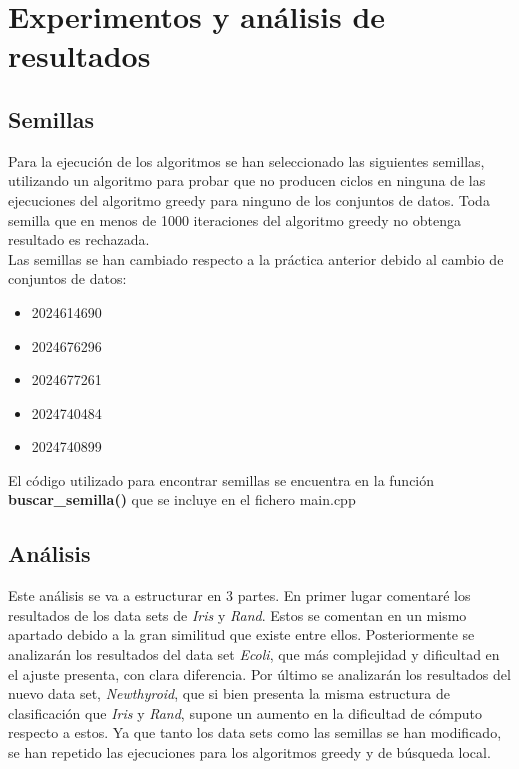\chapter{Experimentos y análisis de resultados}
\section{Semillas}
Para la ejecución de los algoritmos se han seleccionado las siguientes semillas, utilizando un algoritmo para probar que no producen ciclos en ninguna de las ejecuciones del algoritmo greedy para ninguno de los conjuntos de datos. Toda semilla que en menos de 1000 iteraciones del algoritmo greedy no obtenga resultado es rechazada. \\
Las semillas se han cambiado respecto a la práctica anterior debido al cambio de conjuntos de datos:
\begin{itemize}
   \item 2024614690
   \item 2024676296
   \item 2024677261
   \item 2024740484
   \item 2024740899
\end{itemize}


El código utilizado para encontrar semillas se encuentra en la función \textbf{buscar\_semilla()} que se incluye en el fichero main.cpp


\section{Análisis}
Este análisis se va a estructurar en 3 partes. En primer lugar comentaré los resultados de los data sets de \emph{Iris} y \emph{Rand}. Estos se comentan en un mismo apartado debido a la gran similitud que existe entre ellos. Posteriormente se analizarán los resultados del data set \emph{Ecoli}, que más complejidad y dificultad en el ajuste presenta, con clara diferencia. Por último se analizarán los resultados del nuevo data set, \emph{Newthyroid}, que si bien presenta la misma estructura de clasificación que \emph{Iris} y \emph{Rand}, supone un aumento en la dificultad de cómputo respecto a estos. Ya que tanto los data sets como las semillas se han modificado, se han repetido las ejecuciones para los algoritmos greedy y de búsqueda local.

